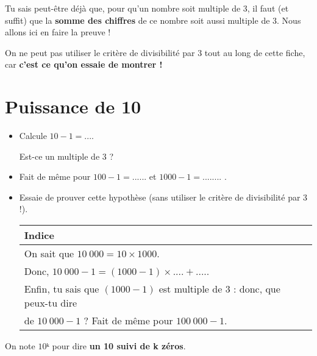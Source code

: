 \documentclass[a4paper,11pt]{article}
\begin{document}
\begin{center}
	\LARGE

\end{center}

Tu sais peut-être déjà que, pour qu'un nombre soit multiple de 3, il faut (et suffit) que la \textbf{somme des chiffres} de ce nombre soit aussi multiple de 3. Nous allons ici en faire la preuve !

\begin{greybox}[frametitle={Remarque :}]
	On ne peut pas utiliser le critère de divisibilité par 3 tout au long de cette fiche, car \textbf{c'est ce qu'on essaie de montrer !}
\end{greybox}

\section{Puissance de 10}

\begin{itemize}
	\item Calcule $10 - 1 = ....$

	      Est-ce un multiple de 3 ?
	\item Fait de même pour $100 - 1 = ......$ et $1000 - 1 = ........$ .

	\item Essaie de prouver cette hypothèse (sans utiliser le critère de divisibilité par 3 !).

	      \renewcommand{\arraystretch}{1.2}
	      \begin{tabular}{|l|}
		      \hline Indice                                                              \\ \hline
		      On sait que $10\ 000 = 10 × 1000$.                                         \\

		      Donc, $10\ 000 - 1 = (1000 - 1) × .... + ....$.                            \\

		      Enfin, tu sais que $(1000 - 1)$ est multiple de 3 : donc, que peux-tu dire \\ de $10\ 000 - 1$ ? Fait de même pour $100\ 000 - 1$.
		      \\ \hline
	      \end{tabular}
\end{itemize}

\begin{notation}[frametitle={Notation}]
	On note $10ᵏ$ pour dire \textbf{un 10 suivi de k zéros}.
\end{notation}
\end{document}
